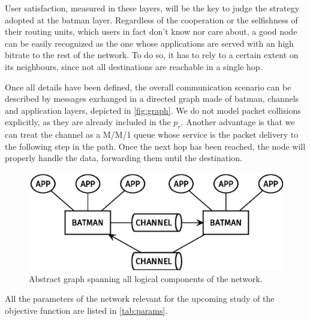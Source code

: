 \documentclass[conference]{IEEEtran}
\begin{document}
User satisfaction, measured in these layers, will be the key to judge the strategy adopted at the \gls{batman} layer.
Regardless of the cooperation or the selfishness of their routing units, which users in fact don't know nor care about, a good node can be easily recognized as the one whose applications are served with an high bitrate to the rest of the network.
To do so, it has to rely to a certain extent on its neighbours, since not all destinations are reachable in a single hop.

\smallskip
Once all details have been defined, the overall communication scenario can be described by messages exchanged in a directed graph made of \gls{batman}, channels and application layers, depicted in \autoref{fig:graph}.
We do not model packet collisions explicitly, as they are already included in the $p_r$. Another advantage is that we can treat the channel as a M/M/1 queue whose service is the packet delivery to the following step in the path.
Once the next hop has been reached, the node will properly handle the data, forwarding them until the destination.

\begin{figure}[h]
  \centering
  \includegraphics[width=\linewidth]{figures/layers_diagram}
  \caption{Abstract graph spanning all logical components of the network.}
  \label{fig:graph}
\end{figure}

All the parameters of the network relevant for the upcoming study of the objective function are listed in \autoref{tab:params}.

\renewcommand\theadalign{l}
\end{document}
